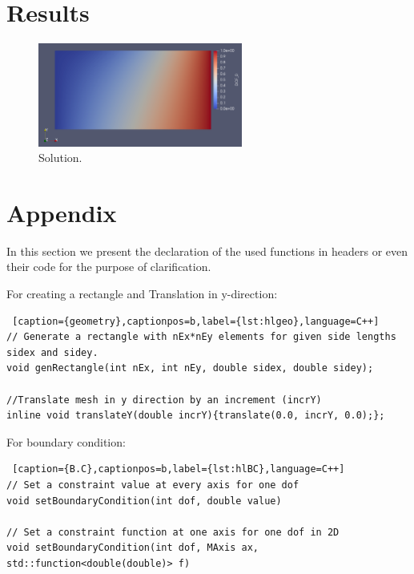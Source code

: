 \documentclass[]{article}
\begin{document}
\section{Results} \label{sec: rst}
\begin{figure}[htbp]
	\centering
	\includegraphics[width=0.6\textwidth]{Figures/result.png}
	\caption{Solution.}
	\label{fig_rst}
\end{figure}
\pagebreak
\section*{Appendix} \label{sec: apx}
In this section we present the declaration of the used functions in headers or even their code for the purpose of clarification.

For creating a rectangle and Translation in y-direction:
\begin{lstlisting} [caption={geometry},captionpos=b,label={lst:hlgeo},language=C++]
// Generate a rectangle with nEx*nEy elements for given side lengths sidex and sidey.
void genRectangle(int nEx, int nEy, double sidex, double sidey);

//Translate mesh in y direction by an increment (incrY)
inline void translateY(double incrY){translate(0.0, incrY, 0.0);};
\end{lstlisting}

For boundary condition:
\begin{lstlisting} [caption={B.C},captionpos=b,label={lst:hlBC},language=C++]
// Set a constraint value at every axis for one dof
void setBoundaryCondition(int dof, double value)

// Set a constraint function at one axis for one dof in 2D
void setBoundaryCondition(int dof, MAxis ax, std::function<double(double)> f)
\end{lstlisting}
\end{document}
